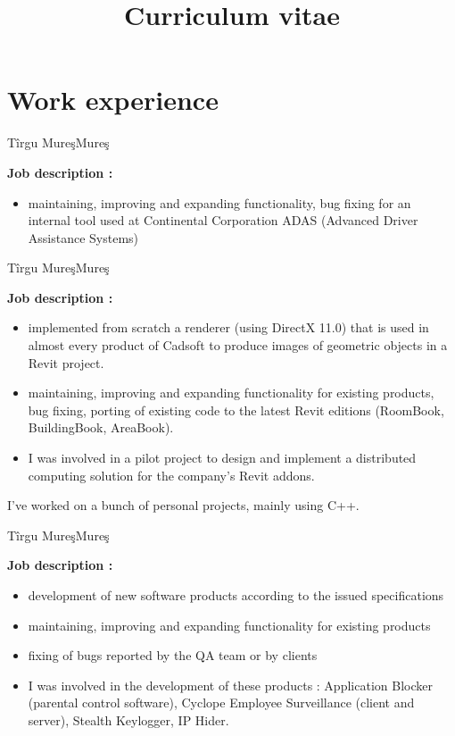 \documentclass[14pt,a4paper,sans]{moderncv}   %
\title{Curriculum vitae}                     %
\begin{document}
\maketitle

\section{Work experience}

{T\^{i}rgu Mure\c{s}}{Mure\c{s}}{
\textbf{Job description :}
\begin{itemize}
\item maintaining, improving and expanding functionality, bug fixing for an internal tool used at Continental Corporation ADAS (Advanced Driver Assistance Systems)
\end{itemize}}

{T\^{i}rgu Mure\c{s}}{Mure\c{s}}{
\textbf{Job description :}
\begin{itemize}
\item implemented from scratch a renderer (using DirectX 11.0) that is used in
almost every product of Cadsoft to produce images of geometric objects in a Revit
project.
\item maintaining, improving and expanding functionality for existing products,
bug fixing, porting of existing code to the latest Revit editions (RoomBook,
BuildingBook, AreaBook).
\item I was involved in a pilot project to design and implement a
distributed computing solution for the company's Revit addons.
\end{itemize}}

 {}{I've worked on a bunch of personal projects, mainly
using C++.}{}

{T\^{i}rgu Mure\c{s}}{Mure\c{s}}{
\textbf{Job description :}
\begin{itemize}
\item development of new software products according to the issued specifications
\item maintaining, improving and expanding functionality for existing products
\item fixing of bugs reported by the QA team or by clients
\item I was involved in the development of these products : 
    Application Blocker (parental control software), 
    Cyclope Employee Surveillance (client and server), 
    Stealth Keylogger, IP Hider.
\end{itemize}}
\end{document}
